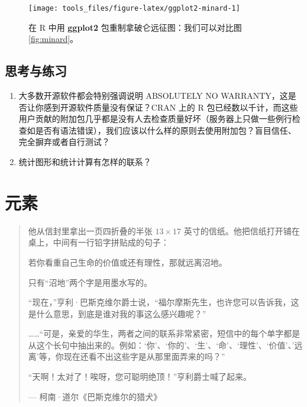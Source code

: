 \documentclass[
  b5paper,
  UTF8,twoside]{book}
\begin{document}
\begin{figure}

{\centering \texttt{[image: tools\_files/figure-latex/ggplot2-minard-1]} 

}

\caption[在 R 中用 \textbf{ggplot2} 包重制拿破仑远征图]{在 R 中用 \textbf{ggplot2} 包重制拿破仑远征图：我们可以对比图 \ref{fig:minard}。}\label{fig:ggplot2-minard}
\end{figure}

\hypertarget{ux601dux8003ux4e0eux7ec3ux4e60-1}{%
\section{思考与练习}\label{ux601dux8003ux4e0eux7ec3ux4e60-1}}

\begin{enumerate}
\def\labelenumi{\arabic{enumi}.}
\item
  大多数开源软件都会特别强调说明 ABSOLUTELY NO WARRANTY，这是否让你感到开源软件质量没有保证？CRAN 上的 R 包已经数以千计，而这些用户贡献的附加包几乎都是没有人去检查质量好坏（服务器上只做一些例行检查如是否有语法错误），我们应该以什么样的原则去使用附加包？盲目信任、完全摒弃或者自行测试？
\item
  统计图形和统计计算有怎样的联系？
\end{enumerate}

\hypertarget{cha:elements}{%
\chapter{元素}\label{cha:elements}}

\begin{quote}
他从信封里拿出一页四折叠的半张 \(13\times17\) 英寸的信纸。他把信纸打开铺在桌上，中间有一行铅字拼贴成的句子：

若你看重自己生命的价值或还有理性，那就远离沼地。

只有``沼地''两个字是用墨水写的。

``现在，''亨利·巴斯克维尔爵士说，``福尔摩斯先生，也许您可以告诉我，这是什么意思，到底是谁对我的事这么感兴趣呢？''

\ldots\ldots{}``可是，亲爱的华生，两者之间的联系非常紧密，短信中的每个单字都是从这个长句中抽出来的。例如：`你'、`你的'、`生'、`命'、`理性'、`价值'、'远离'等，你现在还看不出这些字是从那里面弄来的吗？''

``天啊！太对了！唉呀，您可聪明绝顶！''亨利爵士喊了起来。

\hspace*{\fill} --- 柯南·道尔《巴斯克维尔的猎犬》
\end{quote}
\end{document}
